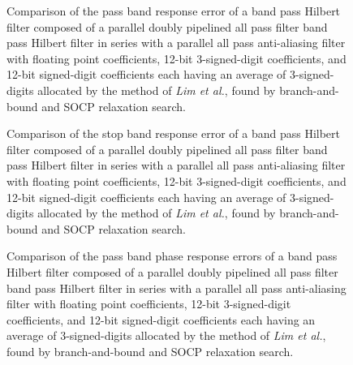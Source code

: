 \documentclass[a4paper,twoside,10pt,english]{article}
\newcommand{\DesignOfSchurLatticeFiltersPdfScale}{1}
\begin{document}
\begin{figure}
\centering
\scalebox{\DesignOfSchurLatticeFiltersPdfScale}{}
\caption{Comparison of the pass band response error of a band pass Hilbert
  filter composed of a parallel doubly pipelined all pass filter band pass
  Hilbert filter in series with a parallel all pass anti-aliasing
  filter with floating point coefficients, 12-bit 3-signed-digit coefficients,
  and 12-bit signed-digit coefficients each having an average of 3-signed-digits
  allocated by the method of \emph{Lim et al.}, found by branch-and-bound and
  SOCP relaxation search.}
\label{fig:Comp-schurOneMPAlattice-doubly-pipelined-bandpass-hilbert-12-nbits-pass}
\end{figure}

\begin{figure}
\centering
\scalebox{\DesignOfSchurLatticeFiltersPdfScale}{}
\caption{Comparison of the stop band response error of a band pass
  Hilbert filter composed of a parallel doubly pipelined all pass filter band
  pass Hilbert filter in series with a parallel all pass anti-aliasing
  filter with floating point coefficients, 12-bit 3-signed-digit coefficients,
  and 12-bit signed-digit coefficients each having an average of 3-signed-digits
  allocated by the method of \emph{Lim et al.}, found by branch-and-bound and
  SOCP relaxation search.}
\label{fig:Comp-schurOneMPAlattice-doubly-pipelined-bandpass-hilbert-12-nbits-stop}
\end{figure}

\begin{figure}
\centering
\scalebox{\DesignOfSchurLatticeFiltersPdfScale}{}
\caption{Comparison of the pass band phase response errors of a band pass
  Hilbert filter composed of a parallel doubly pipelined all pass filter band
  pass Hilbert filter in series with a parallel all pass anti-aliasing
  filter with floating point coefficients, 12-bit 3-signed-digit coefficients,
  and 12-bit signed-digit coefficients each having an average of 3-signed-digits
  allocated by the method of \emph{Lim et al.}, found by branch-and-bound and
  SOCP relaxation search.}
\label{fig:Comp-schurOneMPAlattice-doubly-pipelined-bandpass-hilbert-12-nbits-phase}
\end{figure}
\end{document}
